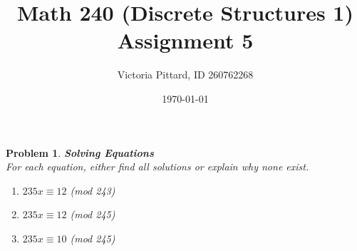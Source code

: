 \documentclass{article}
\newtheorem{problem}{Problem}
\theoremstyle{definition}
\begin{document}
\title{Math 240 (Discrete Structures 1) Assignment 5}
\author{Victoria Pittard, ID 260762268}
\date{\today}

\maketitle

\begin{problem}\textbf{Solving Equations}\\
For each equation, either find all solutions or explain why none exist.
\begin{enumerate}[label=\alph*)]
    \item $235x\equiv 12$ (mod 243)
    
    \item $235x\equiv 12$ (mod 245)
    
    \item $235x\equiv 10$ (mod 245)
\end{enumerate}
\end{problem}
\end{document}
